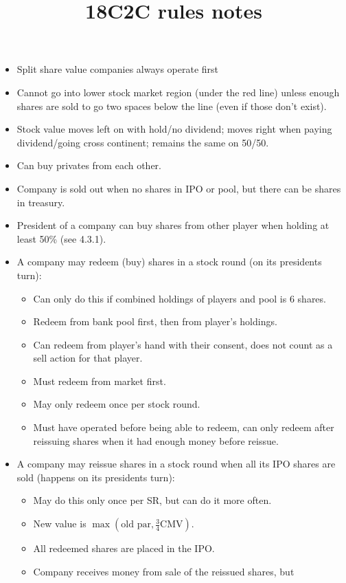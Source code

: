\documentclass[a4paper,twocolumn]{article}
\title{18C2C rules notes}
\author{}
\date{}
\begin{document}
\maketitle

\begin{itemize}
	\item Split share value companies always operate first
	\item Cannot go into lower stock market region (under the red line) unless 
	enough shares are sold to go two spaces below the line (even if those don't 
	exist).
	\item Stock value moves left on with hold/no dividend; moves right when 
	paying dividend/going cross continent; remains the same on 50/50.
	\item Can buy privates from each other.
	\item Company is sold out when no shares in IPO or pool, but there can be 
	shares in treasury.
	\item President of a company can buy shares from other player when holding 
	at least 50\% (see 4.3.1).
	\item A company may redeem (buy) shares in a stock round (on its presidents 
	turn):
	\begin{itemize}
		\item Can only do this if combined holdings of players and pool is 6 
		shares.
		\item Redeem from bank pool first, then from player's holdings.
		\item Can redeem from player's hand with their consent, does not count 
		as a sell action for that player.
		\item Must redeem from market first.
		\item May only redeem once per stock round.
		\item Must have operated before being able to redeem, can only redeem 
		after reissuing shares when it had enough money before reissue.
	\end{itemize}
	\item A company may reissue shares in a stock round when all its IPO shares 
	are sold (happens on its presidents turn):
	\begin{itemize}
		\item May do this only once per SR, but can do it more often.
		\item New value is $\max(\mbox{old par}, \frac{3}{4}\mbox{CMV})$.
		\item All redeemed shares are placed in the IPO.
		\item Company receives money from sale of the reissued shares, but 

\end{itemize}
\end{itemize}
\end{document}
